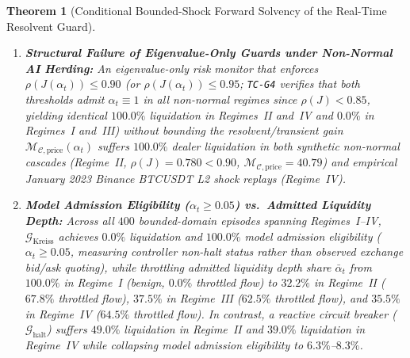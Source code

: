 \documentclass[12pt]{article}
\newtheorem{theorem}{Theorem}[section]
\theoremstyle{definition}
\theoremstyle{remark}
\begin{document}
\begin{theorem}[Conditional Bounded-Shock Forward Solvency of the Real-Time Resolvent Guard]
\begin{enumerate}
\item \textbf{Structural Failure of Eigenvalue-Only Guards under Non-Normal AI Herding:} An eigenvalue-only risk monitor that enforces $\rho(J(\alpha_t)) \le 0.90$ (or $\rho(J(\alpha_t)) \le 0.95$; \texttt{TC-G4} verifies that both thresholds admit $\alpha_t \equiv 1$ in all non-normal regimes since $\rho(J) < 0.85$, yielding identical $100.0\%$ liquidation in Regimes~II and~IV and $0.0\%$ in Regimes~I and~III) without bounding the resolvent/transient gain $\mathcal{M}_{\mathcal{C},\mathrm{price}}(\alpha_t)$ suffers $100.0\%$ dealer liquidation in both synthetic non-normal cascades (Regime~II, $\rho(J) = 0.780 < 0.90$, $\mathcal{M}_{\mathcal{C},\mathrm{price}} = 40.79$) and empirical January 2023 Binance BTCUSDT L2 shock replays (Regime~IV).
\item \textbf{Model Admission Eligibility ($\alpha_t \ge 0.05$) vs.\ Admitted Liquidity Depth:} Across all $400$ bounded-domain episodes spanning Regimes~I--IV, $\mathcal{G}_{\mathrm{Kreiss}}$ achieves $0.0\%$ liquidation and $100.0\%$ model admission eligibility ($\alpha_t \ge 0.05$, measuring controller non-halt status rather than observed exchange bid/ask quoting), while throttling admitted liquidity depth share $\bar{\alpha}_t$ from $100.0\%$ in Regime~I (benign, $0.0\%$ throttled flow) to $32.2\%$ in Regime~II ($67.8\%$ throttled flow), $37.5\%$ in Regime~III ($62.5\%$ throttled flow), and $35.5\%$ in Regime~IV ($64.5\%$ throttled flow). In contrast, a reactive circuit breaker ($\mathcal{G}_{\mathrm{halt}}$) suffers $49.0\%$ liquidation in Regime~II and $39.0\%$ liquidation in Regime~IV while collapsing model admission eligibility to $6.3\%$--$8.3\%$.
\end{enumerate}
\end{theorem}


\end{document}
